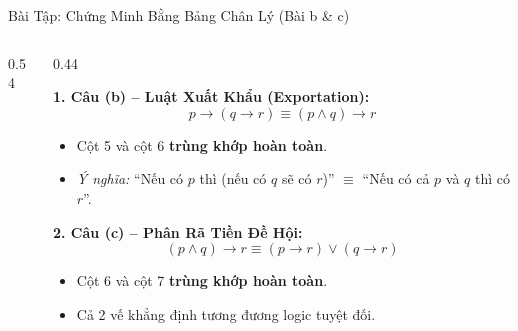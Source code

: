 \documentclass[aspectratio=169, 10pt]{beamer}
\begin{document}
\begin{frame}{Bài Tập: Chứng Minh Bằng Bảng Chân Lý (Bài b \& c)}
\begin{columns}[t, onlytextwidth]
\begin{column}{0.54\textwidth}
\begin{cozyExample}
      \end{cozyExample}
    \end{column}
    \begin{column}{0.44\textwidth}
      \begin{cozyInsight}
        \footnotesize
        \textbf{1. Câu (b) -- Luật Xuất Khẩu (Exportation):}
        $$p \to (q \to r) \equiv (p \land q) \to r$$
        \begin{itemize}
          \setlength{\itemsep}{1pt}
          \item Cột 5 và cột 6 \textbf{trùng khớp hoàn toàn}.
          \item \textit{Ý nghĩa:} ``Nếu có $p$ thì (nếu có $q$ sẽ có $r$)'' $\equiv$ ``Nếu có cả $p$ và $q$ thì có $r$''.
        \end{itemize}
        \vspace{0.06cm}
        \textbf{2. Câu (c) -- Phân Rã Tiền Đề Hội:}
        $$(p \land q) \to r \equiv (p \to r) \lor (q \to r)$$
        \begin{itemize}
          \setlength{\itemsep}{1pt}
          \item Cột 6 và cột 7 \textbf{trùng khớp hoàn toàn}.
          \item Cả 2 vế khẳng định tương đương logic tuyệt đối.
        \end{itemize}
      \end{cozyInsight}
    \end{column}
  \end{columns}
\end{frame}
\end{document}
